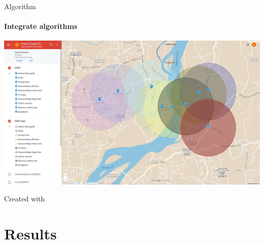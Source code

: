 \documentclass{beamer}
\newcommand{\link}[2]{\href{#1}{\textit{\color{blue}{#2}}}}%
\begin{document}
	\begin{frame}{Algorithm}
		\framesubtitle{Integrate algorithms}
		\begin{center}
			\includegraphics[height=0.7\textheight]{res/camera-network.png}
		\end{center}
		Created with \link{https://www.google.com/maps/d/edit?mid=1s2ST5x4nn-EK3JqU-c9EEGASRq5Ini0&usp=sharing}{Google Maps}
	\end{frame}
	
	



	\section{Results}
\end{document}
